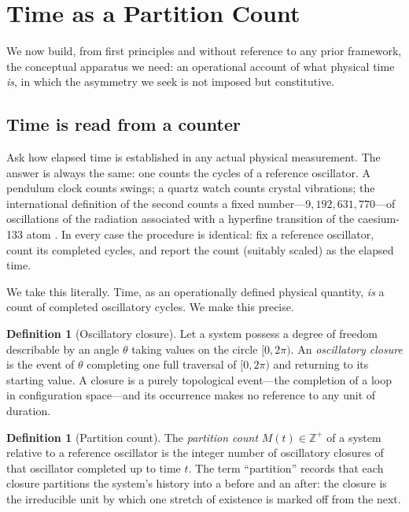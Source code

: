 \documentclass[11pt,a4paper]{article}
\theoremstyle{thmstyle}
\theoremstyle{definition}
\newtheorem{definition}[theorem]{Definition}
\theoremstyle{remark}
\newcommand{\Zp}{\mathbb{Z}^{+}}
\newcommand{\Count}{M}
\begin{document}
\section{Time as a Partition Count}
\label{sec:partition}

We now build, from first principles and without reference to any prior
framework, the conceptual apparatus we need: an operational account of
what physical time \emph{is}, in which the asymmetry we seek is not
imposed but constitutive.

\subsection{Time is read from a counter}
\label{sec:time-counter}

Ask how elapsed time is established in any actual physical measurement.
The answer is always the same: one counts the cycles of a reference
oscillator. A pendulum clock counts swings; a quartz watch counts
crystal vibrations; the international definition of the second counts a
fixed number---$9{,}192{,}631{,}770$---of oscillations of the radiation
associated with a hyperfine transition of the caesium-133 atom
\citep{essen1955}. In every case the procedure is identical: fix a
reference oscillator, count its completed cycles, and report the count
(suitably scaled) as the elapsed time.

We take this literally. Time, as an operationally defined physical
quantity, \emph{is} a count of completed oscillatory cycles. We make this
precise.

\begin{definition}[Oscillatory closure]
\label{def:closure}
Let a system possess a degree of freedom describable by an angle
$\theta$ taking values on the circle $[0,2\pi)$. An \emph{oscillatory
closure} is the event of $\theta$ completing one full traversal of
$[0,2\pi)$ and returning to its starting value. A closure is a purely
topological event---the completion of a loop in configuration
space---and its occurrence makes no reference to any unit of duration.
\end{definition}

\begin{definition}[Partition count]
\label{def:count}
The \emph{partition count} $\Count(t)\in\Zp$ of a system relative to a
reference oscillator is the integer number of oscillatory closures of
that oscillator completed up to time $t$. The term ``partition'' records
that each closure partitions the system's history into a
before and an after: the closure is the irreducible unit by which one
stretch of existence is marked off from the next.
\end{definition}
\end{document}

